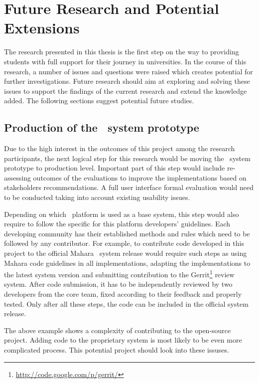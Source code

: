 \section{Future Research and Potential Extensions}
The research presented in this thesis is the first step on the way to providing
students with full support for their \LLLs journey in universities. In the
course of this research, a number of issues and questions were raised which
creates potential for further investigations. Future research should aim at
exploring and solving these issues to support the findings of the current
research and extend the knowledge added. The following sections suggest
potential future studies.

\subsection{Production of the \ep~system prototype}
Due to the high interest in the outcomes of this project among the research
participants, the next logical step for this research would be moving the
\ep~system prototype to production level. Important part of this step would
include re-assessing outcomes of the evaluations to improve the implementations
based on stakeholders recommendations. A full user interface formal evaluation
would need to be conducted taking into account existing usability issues.

Depending on which \ep~platform is used as a base system, this step would also
require to follow the specific for this platform developers' guidelines. Each
developing community has their established methods and rules which need to be
followed by any contributor. For example, to contribute code developed in this
project to the official Mahara \ep~system release would require such steps as
using Mahara code guidelines in all implementations, adapting the
implementations to the latest system version and submitting contribution to the
Gerrit\footnote{\url{http://code.google.com/p/gerrit/}} review system. After
code submission, it has to be independently reviewed by two developers from the
core team, fixed according to their feedback and properly tested. Only after all
these steps, the code can be included in the official system release.

The above example shows a complexity of contributing to the open-source project.
Adding code to the proprietary system is most likely to be even more complicated
process. This potential project should look into these issuses.


